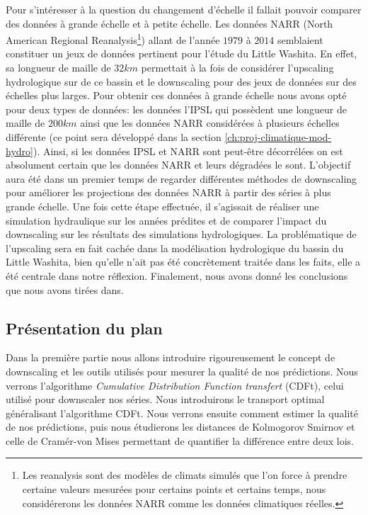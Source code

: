 \documentclass[a4paper,11pt]{article}
\numberwithin{equation}{section}
\begin{document}
Pour s'intéresser à la question du changement d'échelle il fallait pouvoir comparer des données à grande échelle et à petite échelle. Les données NARR (North American Regional Reanalysis\footnote{Les reanalysis sont des modèles de climats simulés que l'on force à prendre certaine valeurs mesurées pour certains points et certains temps, nous considérerons les données NARR comme les données climatiques réelles.}) allant de l'année $1979$ à $2014$ semblaient constituer un jeux de données pertinent pour l'étude du Little Washita. En effet, sa longueur de maille de $32km$ permettait à la fois de considérer l'upscaling hydrologique sur de ce bassin et le downscaling pour des jeux de données sur des échelles plus larges. Pour obtenir ces données à grande échelle nous avons opté pour deux types de données: les données l'IPSL qui possèdent une longueur de maille de $200km$ ainsi que les données NARR considérées à plusieurs échelles différente (ce point sera développé dans la section \ref{ch:proj-climatique-mod-hydro}). Ainsi, si les données IPSL et NARR sont peut-être décorrélées on est absolument certain que les données NARR et leurs dégradées le sont. L'objectif aura été dans un premier temps de regarder différentes méthodes de downscaling pour améliorer les projections des données NARR à partir des séries à plus grande échelle. Une fois cette étape effectuée, il s'agissait de réaliser une simulation hydraulique sur les années prédites et de comparer l'impact du downscaling sur les résultats des simulations hydrologiques. La problématique de l'upscaling sera en fait cachée dans la modélisation hydrologique du bassin du Little Washita, bien qu'elle n'ait pas été concrètement traitée dans les faits, elle a été centrale dans notre réflexion. Finalement, nous avons donné les conclusions que nous avons tirées dans.

\subsection{Présentation du plan}
\label{ch:presentation plan}

Dans la première partie nous allons introduire rigoureusement le concept de downscaling et les outils utilisés pour mesurer la qualité de nos prédictions. Nous verrons l'algorithme \textit{Cumulative Distribution Function transfert} (CDFt), celui utilisé pour downscaler nos séries. Nous introduirons le transport optimal généralisant l'algorithme CDFt. Nous verrons ensuite comment estimer la qualité de nos prédictions, puis nous étudierons les distances de Kolmogorov Smirnov et celle de Cramér-von Mises permettant de quantifier la différence entre deux lois. 
\end{document}
